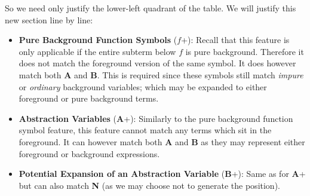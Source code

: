 So we need only justify the lower-left quadrant of the table.
We will justify this new section line by line:
\begin{itemize}
\item \textbf{Pure Background Function Symbols} ($f$+): Recall that this feature is only applicable
if the entire subterm below $f$ is pure background. Therefore it does not
match the foreground version of the same symbol. It does however match both
\textbf{A} and \textbf{B}. This is required since these symbols still match \emph{impure} or \emph{ordinary} background variables;
which may be expanded to either foreground or pure background terms.
\item \textbf{Abstraction Variables} (\textbf{A}+): Similarly to the pure background function symbol
feature, this feature cannot match any terms which sit in the foreground. It can however
match both \textbf{A} and \textbf{B} as they may represent either foreground or background
expressions.
\item \textbf{Potential Expansion of an Abstraction Variable} (\textbf{B}+): Same as for \textbf{A}+
but can also match \textbf{N} (as we may choose not to generate the position).
\end{itemize}

